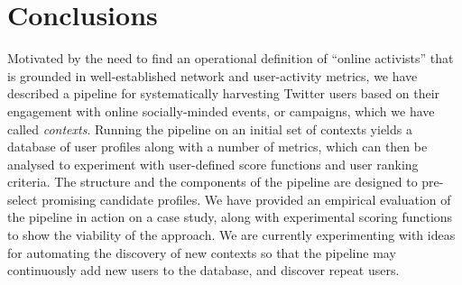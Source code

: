 \section{Conclusions}
\vspace{-10pt}

Motivated by the need to find an operational definition of ``online activists'' that is grounded in well-established network and user-activity metrics, we have described a pipeline for systematically harvesting Twitter users based on their engagement with online socially-minded events, or campaigns, which we have called \textit{contexts}.
Running the pipeline on an initial set of contexts yields a database of user profiles along with a number of metrics, which can then be analysed to experiment with user-defined score functions and user ranking criteria. The structure and the components of the pipeline are designed to pre-select promising candidate profiles. 
We have provided an empirical evaluation of the pipeline in action on a case study, along with experimental scoring functions to show the viability of the approach. 
We are currently experimenting with ideas for automating the discovery of new contexts so that the pipeline may continuously add new users to the database, and discover repeat users.